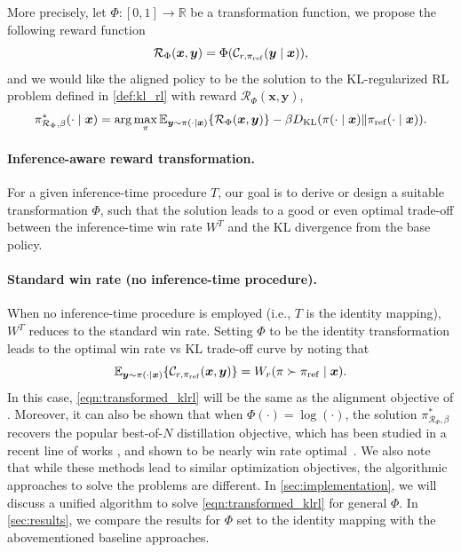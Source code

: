 \documentclass{article}
\newcommand{\by}{{\bm{y}}}
\newcommand{\bx}{{\bm{x}}}
\newcommand{\cR}{\mathcal{R}}
\newcommand{\reg}{\beta}
\newcommand{\KL}{D_{\text{KL}}}
\newcommand{\bp}{{\pi_{\rm ref}}} %
\newcommand{\op}{\pi} %
\newcommand{\car}{\mathcal{C}} %
\newcommand{\RR}{\mathbb{R}}
\begin{document}
%
More precisely, let $\Phi: [0, 1] \rightarrow \RR $ be a transformation function, we propose the following reward function 
%
%
 \begin{equation} \label{eqn:transformed_reward}
   \cR_\Phi(\bx, \by) = \Phi(\car_{r, \bp}(\by\mid \bx)),
\end{equation}
and we would like the aligned policy to be the solution to the KL-regularized RL problem defined in \cref{def:kl_rl} with reward $\cR_\Phi(\bx, \by)$,
\begin{equation} \label{eqn:transformed_klrl}
    \op^*_{\cR_\Phi, \reg}(\cdot \mid \bx) = \arg \max_\op \mathbb{E}_{\by \sim \op(\cdot \mid \bx)} \{\cR_\Phi(\bx, \by)\} - \reg \KL(\op(\cdot \mid \bx) \| \bp(\cdot \mid \bx)).
\end{equation}
%
%
%
%
%

%
\paragraph{Inference-aware reward transformation.} For a given inference-time procedure $T$, our goal is to derive or design a suitable transformation $\Phi$, such that the solution leads to a good or even optimal trade-off between the inference-time win rate $W^T$ and the KL divergence  from the base policy.

\paragraph{Standard win rate (no inference-time procedure).} When no inference-time procedure is employed (i.e., $T$ is the identity mapping), $W^T$ reduces to the standard win rate. Setting $\Phi$ to be the identity transformation leads to the optimal win rate vs KL trade-off curve by noting that
\[
    \mathbb{E}_{\by \sim \op(\cdot \mid \bx)} \{\car_{r, \bp}(\bx, \by)\} 
    = W_r(\pi \succ \bp \mid \bx).
\]
In this case, \cref{eqn:transformed_klrl} will be the same as the alignment objective of \citet{azar2023general}. Moreover, it can also be shown that when $\Phi(\cdot) = \log(\cdot)$, the solution $ \op^*_{\cR_\Phi, \reg}$ recovers the popular best-of-$N$ distillation objective, which has been studied in a recent line of works \citep{gui2024bonbonalignmentlargelanguage, amini2024variationalbestofnalignment,sessa2024bondaligningllmsbestofn}, and shown to be nearly win rate optimal~\citep{yang2024asymptotics, gui2024bonbonalignmentlargelanguage}.
%
%
We also note that while these methods lead to similar optimization objectives, the algorithmic approaches to solve the problems are different. In \cref{sec:implementation}, we will discuss a unified algorithm to solve \cref{eqn:transformed_klrl} for general $\Phi$. In \cref{sec:results}, we compare the results for $\Phi$ set to the identity mapping with the abovementioned baseline approaches.
\end{document}
